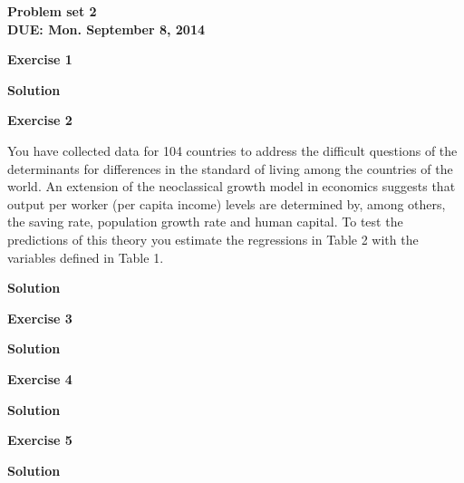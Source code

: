 \documentclass[12pt]{article}
\begin{document}


\begin{center}
\textbf{Problem set 2 \\
DUE: Mon. September 8, 2014 \\}
\end{center}


\bigskip
	
\textbf{Exercise 1}	
\medskip	
		
\textbf{Solution}
\medskip

\textbf{Exercise 2}	

You have collected data for 104 countries to address the difficult questions of the determinants for differences in the standard of living among the countries of the world. An extension of the neoclassical growth model in economics suggests that output per worker (per capita income) levels are determined by, among others, the saving rate, population growth rate and human capital. To test the predictions of this theory you estimate the regressions in Table 2 with the variables defined in Table 1.
\medskip
		
\textbf{Solution}
\medskip

\textbf{Exercise 3}
\medskip

\textbf{Solution}
\medskip

\textbf{Exercise 4}
\medskip

\textbf{Solution}
\medskip

\textbf{Exercise 5}
\medskip

\textbf{Solution}
\medskip
\end{document}
